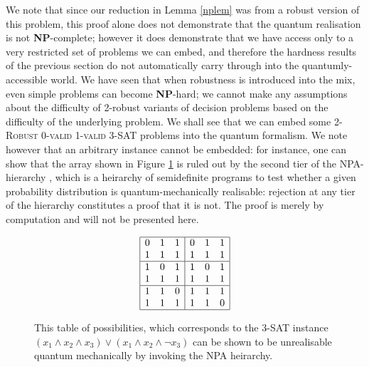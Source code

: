 \documentclass[reprint]{revtex4-1}
\theoremstyle{definition}
\begin{document}
We note that since our reduction in Lemma \ref{nplem} was from a robust version of this problem, this proof alone does not demonstrate that the quantum realisation is not \textbf{NP}-complete; however it does demonstrate that we have access only to a very restricted set of problems we can embed, and therefore the hardness results of the previous section do not automatically carry through into the quantumly-accessible world. We have seen that when robustness is introduced into the mix, even simple problems can become \textbf{NP}-hard; we cannot make any assumptions about the difficulty of 2-robust variants of decision problems based on the difficulty of the underlying problem. We shall see that we can embed some \textsc{2-Robust 0-valid 1-valid 3-SAT} problems into the quantum formalism. We note however that an arbitrary instance cannot be embedded: for instance, one can show that the array shown in Figure \ref{badarray} is ruled out by the second tier of the NPA-hierarchy \cite{Nava2008}, which is a heirarchy of semidefinite programs to test whether a given probability distribution is quantum-mechanically realisable: rejection at any tier of the hierarchy constitutes a proof that it is not. The proof is merely by computation and will not be presented here. 
\begin{figure}
\begin{equation*} 
\begin{array}{  | c c  c| c c c|}
\hline
 0 & 1 & 1 & 0 & 1 & 1 \\
 1 & 1& 1& 1 & 1& 1 \\ \hline
 1 &0 & 1 & 1 &0 & 1 \\
 1 & 1& 1 & 1 & 1& 1  \\ \hline
 1 & 1 & 0&  1 & 1 & 1\\
 1 & 1& 1 &1 & 1 & 0 \\ \hline
 \end{array}
 \end{equation*} 
\caption{This table of possibilities, which corresponds to the \textsc{3-SAT} instance $(x_1\wedge x_2 \wedge x_3)\vee (x_1\wedge x_2 \wedge \neg x_3)$ can be shown to be unrealisable quantum mechanically by invoking the NPA heirarchy.}
\label{badarray}
\end{figure}
 
\end{document}
